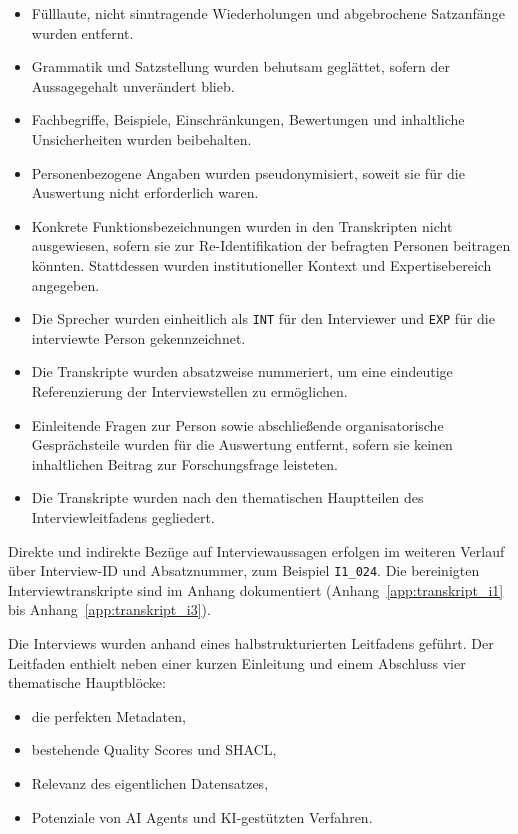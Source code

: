\begin{itemize}
    \item Fülllaute, nicht sinntragende Wiederholungen und abgebrochene Satzanfänge wurden entfernt.
    \item Grammatik und Satzstellung wurden behutsam geglättet, sofern der Aussagegehalt unverändert blieb.
    \item Fachbegriffe, Beispiele, Einschränkungen, Bewertungen und inhaltliche Unsicherheiten wurden beibehalten.
    \item Personenbezogene Angaben wurden pseudonymisiert, soweit sie für die Auswertung nicht erforderlich waren.
    \item Konkrete Funktionsbezeichnungen wurden in den Transkripten nicht ausgewiesen, sofern sie zur Re-Identifikation der befragten Personen beitragen könnten. Stattdessen wurden institutioneller Kontext und Expertisebereich angegeben.
    \item Die Sprecher wurden einheitlich als \texttt{INT} für den Interviewer und \texttt{EXP} für die interviewte Person gekennzeichnet.
    \item Die Transkripte wurden absatzweise nummeriert, um eine eindeutige Referenzierung der Interviewstellen zu ermöglichen.
    \item Einleitende Fragen zur Person sowie abschließende organisatorische Gesprächsteile wurden für die Auswertung entfernt, sofern sie keinen inhaltlichen Beitrag zur Forschungsfrage leisteten.
    \item Die Transkripte wurden nach den thematischen Hauptteilen des Interviewleitfadens gegliedert.
\end{itemize}

Direkte und indirekte Bezüge auf Interviewaussagen erfolgen im weiteren Verlauf über Interview-ID und Absatznummer, zum Beispiel \texttt{I1\_024}. Die bereinigten Interviewtranskripte sind im Anhang dokumentiert (Anhang~\ref{app:transkript_i1} bis Anhang~\ref{app:transkript_i3}).

Die Interviews wurden anhand eines halbstrukturierten Leitfadens geführt. Der Leitfaden enthielt neben einer kurzen Einleitung und einem Abschluss vier thematische Hauptblöcke:

\begin{itemize}
    \item die perfekten Metadaten,
    \item bestehende Quality Scores und SHACL,
    \item Relevanz des eigentlichen Datensatzes,
    \item Potenziale von \acrfull{AI} Agents und KI-gestützten Verfahren.
\end{itemize}

